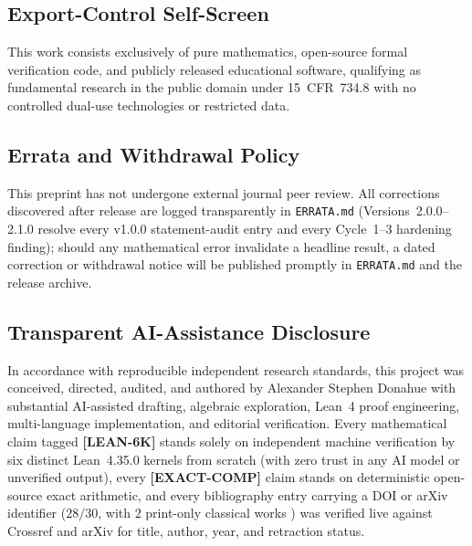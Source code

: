 \documentclass[11pt,reqno]{amsart}
\newcommand{\code}[1]{\textnormal{\texttt{\small\nolinkurl{#1}}}}
\theoremstyle{plain}
\theoremstyle{definition}
\theoremstyle{remark}
\newcommand{\tagLean}{\mbox{\textsf{\textbf{\color{oiBlue}[LEAN-6K]}}}}
\newcommand{\tagComp}{\mbox{\textsf{\textbf{\color{oiGreen}[EXACT-COMP]}}}}
\begin{document}
\subsection*{Export-Control Self-Screen}
This work consists exclusively of pure mathematics, open-source formal verification code, and
publicly released educational software, qualifying as fundamental research in the public domain
under 15~CFR~734.8 with no controlled dual-use technologies or restricted data.

\subsection*{Errata and Withdrawal Policy}
This preprint has not undergone external journal peer review. All corrections discovered after
release are logged transparently in \code{ERRATA.md} (Versions~2.0.0--2.1.0 resolve every
v1.0.0 statement-audit entry and every Cycle~1--3 hardening finding); should any mathematical
error invalidate a headline result, a dated correction or withdrawal notice will be published
promptly in \code{ERRATA.md} and the release archive.

\subsection*{Transparent AI-Assistance Disclosure}
In accordance with reproducible independent research standards, this project was conceived,
directed, audited, and authored by Alexander Stephen Donahue with substantial AI-assisted
drafting, algebraic exploration, Lean~4 proof engineering, multi-language implementation, and
editorial verification. Every mathematical claim tagged \tagLean{} stands solely on independent
machine verification by six distinct Lean~4.35.0 kernels from scratch (with zero trust in any
AI model or unverified output), every \tagComp{} claim stands on deterministic open-source exact
arithmetic, and every bibliography entry carrying a DOI or arXiv identifier ($28/30$, with
$2$ print-only classical works \cite{hurwitz1898,adem1975}) was verified live against Crossref
and arXiv for title, author, year, and retraction status.



\end{document}
